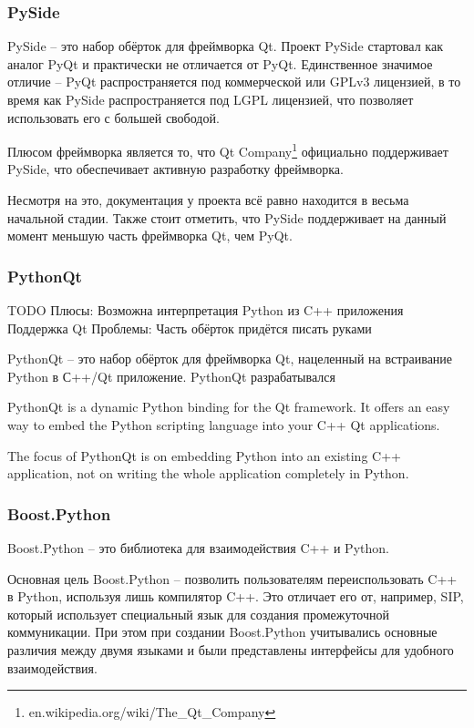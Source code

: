\documentclass[14pt]{matmex-diploma-custom}
\begin{document}
\subsubsection{PySide}
PySide -- это набор обёрток для фреймворка Qt. Проект PySide стартовал как аналог PyQt и практически не отличается от PyQt. Единственное значимое отличие -- PyQt распространяется под коммерческой или GPLv3 лицензией, в то время как PySide распространяется под LGPL лицензией, что позволяет использовать его с большей свободой. 

Плюсом фреймворка является то, что Qt Company\footnote{en.wikipedia.org/wiki/The\_Qt\_Company} официально поддерживает PySide, что обеспечивает активную разработку фреймворка. 

Несмотря на это, документация у проекта всё равно находится в весьма начальной стадии. Также стоит отметить, что PySide поддерживает на данный момент меньшую часть фреймворка Qt, чем PyQt.

\subsubsection{PythonQt}
TODO
Плюсы:
Возможна интерпретация Python из C++ приложения
Поддержка Qt
Проблемы:
Часть обёрток придётся писать руками

PythonQt -- это набор обёрток для фреймворка Qt, нацеленный на встраивание Python в С++/Qt приложение. PythonQt разрабатывался

PythonQt is a dynamic Python binding for the Qt framework. It offers an easy way to embed the Python scripting language into your C++ Qt applications.

The focus of PythonQt is on embedding Python into an existing C++ application, not on writing the whole application completely in Python.

\subsubsection{Boost.Python}
Boost.Python \cite{abrahams2003boost} -- это библиотека для взаимодействия C++ и Python. 

Основная цель Boost.Python -- позволить пользователям переиспользовать C++ в Python, используя лишь компилятор C++. Это отличает его от, например, SIP, который использует специальный язык для создания промежуточной коммуникации. При этом при создании Boost.Python учитывались основные различия между двумя языками и были представлены интерфейсы для удобного взаимодействия.
\end{document}
